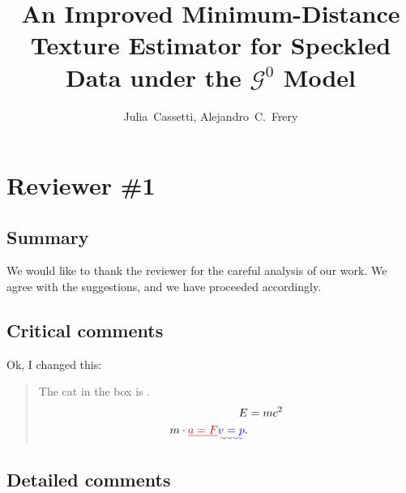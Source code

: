 \documentclass{ar2rc}
\title{An Improved Minimum-Distance Texture Estimator for Speckled Data under the $\mathcal{G}^0$ Model}
\author{Julia~Cassetti,
	Alejandro~C.~Frery}
\begin{document}
	
	\maketitle
	
	\section{Reviewer \#1}
	
	\subsection{Summary}
	

\AR We would like to thank the reviewer for the careful analysis of our work.
We agree with the suggestions, and we have proceeded accordingly.
	
	\subsection{Critical comments}

	
	\AR Ok, I changed this:
	
	\begin{quote}
		The cat in the box is \DIFdelbegin {}\DIFdelend \DIFaddbegin {}\DIFaddend .
		\begin{align}
			E &= mc^2 \\
			m\cdot \DIFdelbegin \DIFdel{a=F}\DIFdelend \DIFaddbegin \DIFadd{v=p}\DIFaddend .
		\end{align}
	\end{quote}
	
\subsection{Detailed comments}

	
\end{document}
